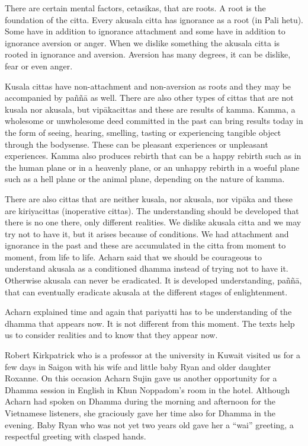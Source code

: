{{{There are certain mental factors,
cetasikas, that are roots. A root is the foundation of the citta. Every
akusala citta has ignorance as a root (in Pali hetu). Some have in
addition to ignorance attachment and some have in addition to ignorance
aversion or anger. When we dislike something the akusala citta is rooted
in ignorance and aversion. Aversion has many degrees, it can be dislike,
fear or even anger.

Kusala cittas have non-attachment and
non-aversion as roots and they may be accompanied by paññā as well.
There are also other types of cittas that are not kusala nor akusala,
but vipākacittas and these are results of kamma. Kamma, a wholesome or
unwholesome deed committed in the past can bring results today in the
form of seeing, hearing, smelling, tasting or experiencing tangible
object through the bodysense. These can be pleasant experiences or
unpleasant experiences. Kamma also produces rebirth that can be a happy
rebirth such as in the human plane or in a heavenly plane, or an unhappy
rebirth in a woeful plane such as a hell plane or the animal plane,
depending on the nature of kamma.

There are also cittas that are neither
kusala, nor akusala, nor vipāka and these are kiriyacittas (inoperative
cittas).
The understanding should be developed
that there is no one there, only different realities. We dislike akusala
citta and we may try not to have it, but it arises because of
conditions. We had attachment and ignorance in the past and these are
accumulated in the citta from moment to moment, from life to life.
Acharn said that we should be courageous to understand akusala as a
conditioned dhamma instead of trying not to have it. Otherwise akusala
can never be eradicated. It is developed understanding, paññā, that can
eventually eradicate akusala at the different stages of enlightenment. 

Acharn explained time and again that
pariyatti has to be understanding of the dhamma that appears now. It is
not different from this moment. The texts help us to consider realities
and to know that they appear now. 

Robert Kirkpatrick who is a professor
at the university in Kuwait visited us for a few days in Saigon with his
wife and little baby Ryan and older daughter Roxanne. On this occasion
Acharn Sujin gave us another opportunity for a Dhamma session in English
in Khun Noppadom's room in the hotel. Although Acharn had spoken on
Dhamma during the morning and afternoon for the Vietnamese listeners,
she graciously gave her time also for Dhamma in the evening. Baby Ryan
who was not yet two years old gave her a ``wai'' greeting, a respectful
greeting with clasped hands. 

}}}
